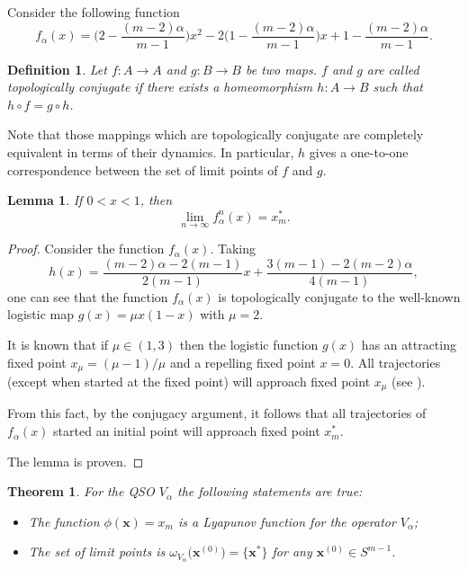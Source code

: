 \documentclass[11pt,reqno]{amsart}
\newtheorem{theorem}[subsection]{Theorem}
\newtheorem{lemma}[subsection]{Lemma}
\newtheorem{definition}[subsection]{Definition}
\numberwithin{equation}{section} \setcounter{tocdepth}{1}
\begin{document}
Consider the following function
\[f_\alpha (x)=\Big(2-\frac{(m-2)\alpha}{ m-1}\Big) x^2-2\Big(1-\frac{(m-2)\alpha}{ m-1}\Big)x+1-\frac{(m-2)\alpha}{ m-1}.\]

\begin{definition} Let $f \colon A \to A$ and $g \colon B \to B$ be two maps. $f$ and $g$ are called
topologically conjugate if there exists a homeomorphism $h \colon A \to B$ such that $h\circ f = g\circ h$.
\end{definition}
Note that those mappings which are topologically conjugate are completely equivalent
in terms of their dynamics. In particular, $h$ gives a one-to-one correspondence between
the set of limit points of $f$ and $g$.


\begin{lemma}\label{falfa} If $0<x<1$, then
\[\lim\limits_{n\rightarrow\infty} f^n_\alpha(x)=x_m^*.\]
\end{lemma}

\begin{proof}

Consider the function $f_\alpha(x)$. Taking
\[h(x) = \frac{(m-2)\alpha-2(m-1)}{ 2(m-1)}x + \frac{3(m-1)-2(m-2)\alpha}{ 4(m-1)},\]
one can see that the function $f_\alpha(x)$
is topologically conjugate to the well-known logistic map $g(x) = \mu x(1-x)$ with $\mu=2$.

 It is known that if $\mu\in (1, 3)$ then  the logistic function $g(x)$ has an attracting fixed point $x_\mu = (\mu-1)/\mu$ and a repelling fixed
point $x = 0$. All trajectories (except when started at the fixed point) will approach
fixed point $x_\mu$ (see \cite{Dev}).

From this fact, by the conjugacy argument, it follows that all trajectories of $f_\alpha(x)$ started an initial point will approach fixed
point $x_m^*$.

The lemma is proven.

\end{proof}

\begin{theorem} For the QSO $V_\alpha$ the following statements are true:
\begin{itemize}
\item[i)] The function $\phi(\mathbf{x}) =x_m$ is a Lyapunov function for the operator $V_\alpha$;
\item[ii)] The set of limit points is $\omega_{V_\alpha}\big(\mathbf{x}^{(0)}\big)=\{\mathbf{x}^*\}$ for any $\mathbf{x}^{(0)}\in S^{m-1}$.
\end{itemize}
\end{theorem}
\end{document}
